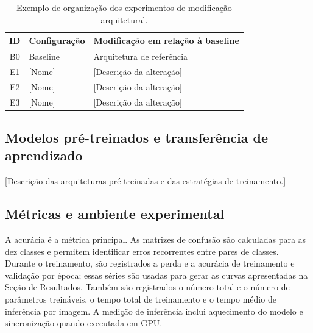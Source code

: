 \documentclass[10pt,a4paper]{article}
\begin{document}
\begin{table}[H]
\centering
\caption{Exemplo de organização dos experimentos de modificação arquitetural.}
\label{tab:experimentos}
\small
\begin{tabular}{clp{7cm}}
\toprule
ID & Configuração & Modificação em relação à baseline\\
\midrule
B0 & Baseline & Arquitetura de referência\\
E1 & [Nome] & [Descrição da alteração]\\
E2 & [Nome] & [Descrição da alteração]\\
E3 & [Nome] & [Descrição da alteração]\\
\bottomrule
\end{tabular}
\end{table}

\subsection{Modelos pré-treinados e transferência de aprendizado}

[Descrição das arquiteturas pré-treinadas e das estratégias de treinamento.]

\subsection{Métricas e ambiente experimental}

A acurácia é a métrica principal. As matrizes de confusão são calculadas para as
dez classes e permitem identificar erros recorrentes entre pares de classes.
Durante o treinamento, são registrados a perda e a acurácia de treinamento e
validação por época; essas séries são usadas para gerar as curvas apresentadas
na Seção de Resultados. Também são registrados o número total e o número de
parâmetros treináveis, o tempo total de treinamento e o tempo médio de
inferência por imagem. A medição de inferência inclui aquecimento do modelo e
sincronização quando executada em GPU.
\end{document}
